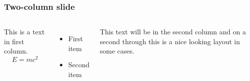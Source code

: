 \documentclass{beamer}
\begin{document}
\begin{frame}
    \frametitle{Two-column slide}

    \begin{columns}

        This is a text in first column.
        $$E=mc^2$$
        \begin{itemize}
            \item First item
            \item Second item
        \end{itemize}

        This text will be in the second column
        and on a second through this is a nice looking
        layout in some cases.

    \end{columns}
\end{frame}
\end{document}
